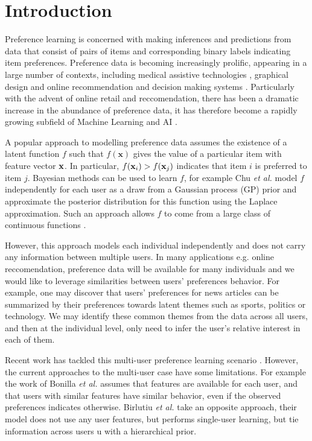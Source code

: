 \section{Introduction}

Preference learning is concerned with making inferences and predictions from data that consist of
pairs of items and corresponding binary labels indicating item preferences.
Preference data is becoming increasingly prolific, appearing in a large number of contexts, including medical assistive technologies \citep{birlutiu2009}, graphical design \citep{brochu2007} and online recommendation and decision making systems \citep{de2009}.
Particularly with the advent of online retail and reccomendation, there has been a dramatic increase in the abundance of preference data, it has therefore become a rapidly growing subfield of Machine Learning and AI \citep{furnkranz2010}.

A popular approach to modelling preference data assumes the existence of a latent function $f$ such that $f(\mathbf{x})$ gives the value of a particular item with feature vector $\mathbf{x}$. In particular, $f(\mathbf{x}_i)>f(\mathbf{x}_j)$ indicates that item $i$ is preferred to item $j$. Bayesian methods can be used to learn $f$, for example Chu \emph{et al.} model $f$ independently for each user as a draw from a Gaussian process (GP) prior and approximate the posterior distribution for this function using the Laplace approximation. Such an approach allows $f$ to come from a large class of continuous functions \citep{chu2005}.
 
However, this approach models each individual independently and does not carry any information between multiple users. In many applications e.g. online reccomendation, preference data will be available for many individuals and we would like to leverage similarities between users' preferences behavior. 
For example, one may discover that users' preferences for news articles can be summarized by their preferences
towards latent themes such as sports, politics or technology. We may identify these common themes
from the data across all users, and then at the individual level, only need to infer the user's relative interest in each of them.

Recent work has tackled this multi-user preference learning scenario \citep{birlutiu2009, Bonilla2010}. 
However, the current approaches to the multi-user case have some limitations.
For example the work of Bonilla \emph{et al.} assumes that features are 
available for each user, and that users with similar features have similar behavior,
even if the observed preferences indicates otherwise.
Birlutiu \emph{et al.} take an opposite approach, their model does not use any user features,
but performs single-user learning, but tie information across users u
with a hierarchical prior. 

